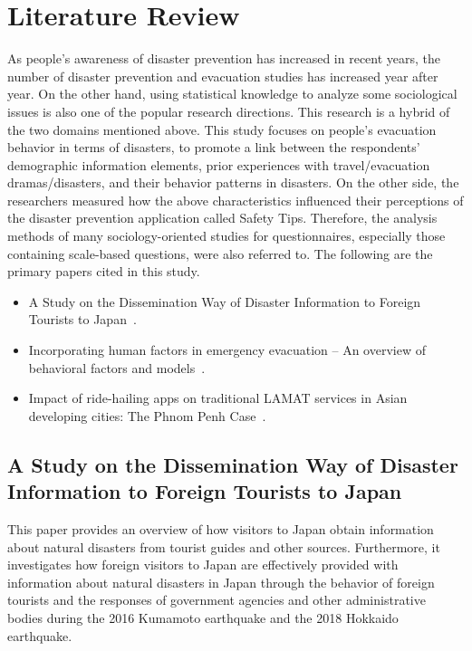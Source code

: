 

\chapter{Literature Review}
\label{c2}

As people's awareness of disaster prevention has increased in recent years, the number of disaster prevention and evacuation studies has increased year after year. On the other hand, using statistical knowledge to analyze some sociological issues is also one of the popular research directions. This research is a hybrid of the two domains mentioned above. This study focuses on people's evacuation behavior in terms of disasters, to promote a link between the respondents' demographic information elements, prior experiences with travel/evacuation dramas/disasters, and their behavior patterns in disasters. On the other side, the researchers measured how the above characteristics influenced their perceptions of the disaster prevention application called Safety Tips. Therefore, the analysis methods of many sociology-oriented studies for questionnaires, especially those containing scale-based questions, were also referred to. The following are the primary papers cited in this study.
\begin{itemize}
  \item A Study on the Dissemination Way of Disaster Information to Foreign Tourists to Japan~\cite{ref8}. 
  \item Incorporating human factors in emergency evacuation – An overview of behavioral factors and models~\cite{ref9}.
  \item Impact of ride-hailing apps on traditional LAMAT services in Asian developing cities: The Phnom Penh Case~\cite{ref7}.
\end{itemize}

\section{A Study on the Dissemination Way of Disaster Information to Foreign Tourists to Japan}

This paper provides an overview of how visitors to Japan obtain information about natural disasters from tourist guides and other sources. Furthermore, it investigates how foreign visitors to Japan are effectively provided with information about natural disasters in Japan through the behavior of foreign tourists and the responses of government agencies and other administrative bodies during the 2016 Kumamoto earthquake and the 2018 Hokkaido earthquake.

